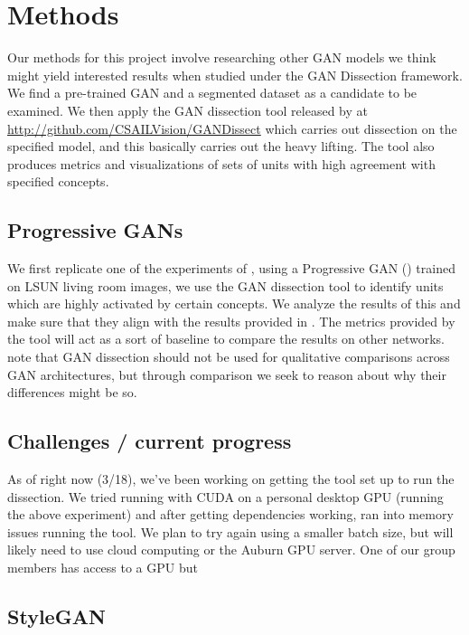 \documentclass{article}
\begin{document}
\section{Methods}

Our methods for this project involve researching other GAN models we think might yield interested results when studied under the GAN Dissection \cite{gandissect2019} framework. We find a pre-trained GAN and a segmented dataset as a candidate to be examined. We then apply the GAN dissection tool released by \citet{gandissect2019} at \url{http://github.com/CSAILVision/GANDissect} which carries out dissection on the specified model, and this basically carries out the heavy lifting. The tool also produces metrics and visualizations of sets of units with high agreement with specified concepts. 

\subsection{Progressive GANs}

We first replicate one of the experiments of \citet{gandissect2019}, using a Progressive GAN (\cite{progan2017}) trained on LSUN living room images, we use the GAN dissection tool to identify units which are highly activated by certain concepts. We analyze the results of this and make sure that they align with the results provided in \citet{gandissect2019}. The metrics provided by the tool will act as a sort of baseline to compare the results on other networks. \citet{gandissect2019} note that GAN dissection should not be used for qualitative comparisons across GAN architectures, but through comparison we seek to reason about why their differences might be so.

\subsection{Challenges / current progress}

As of right now (3/18), we've been working on getting the tool set up to run the dissection. We tried running with CUDA on a personal desktop GPU (running the above experiment) and after getting dependencies working, ran into memory issues running the tool. We plan to try again using a smaller batch size, but will likely need to use cloud computing or the Auburn GPU server. One of our group members has access to a GPU but 

\subsection{StyleGAN }
\end{document}
